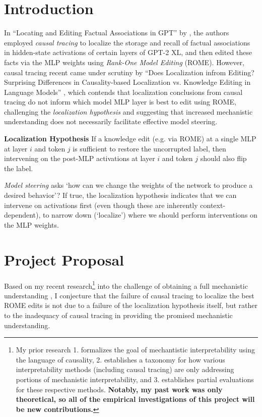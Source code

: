 \documentclass{article}
\begin{document}
\section{Introduction}

In ``Locating and Editing Factual Associations in GPT'' by \citet{meng2022locating}, the authors employed \emph{causal tracing} to localize the storage and recall of factual associations in hidden-state activations of certain layers of GPT-2 XL, and then edited these facts via the MLP weights using \emph{Rank-One Model Editing} (ROME). However, causal tracing recent came under scrutiny by ``Does Localization infrom Editing? Surprising Differences in Causality-based Localization vs. Knowledge Editing in Language Models'' \cite{hase2023does}, which contends that localization conclusions from causal tracing do not inform which model MLP layer is best to edit using ROME, challenging the \emph{localization hypothesis} and suggesting that increased mechanistic understanding does not necessarily facilitate effective model steering. 

\begin{definition} {\textbf{Localization Hypothesis}}
  If a knowledge edit (e.g. via ROME) at a single MLP at layer $i$ and token $j$ is sufficient to restore the uncorrupted label, then intervening on the post-MLP activations at layer $i$ and token $j$ should also flip the label.
\end{definition}

\emph{Model steering} asks `how can we change the weights of the network to produce a desired behavior'? If true, the localization hypothesis indicates that we can intervene on activations first (even though these are inherently context-dependent), to narrow down (`localize') where we should perform interventions on the MLP weights.

\section{Project Proposal}

Based on my recent research\footnote{My prior research 1. formalizes the goal of mechantistic interpretability using the language of causality, 2. establishes a taxonomy for how various interpretability methods (including causal tracing) are only addressing portions of mechanistic interpretability, and 3. establishes partial evaluations for these respective methods. \textbf{Notably, my past work was only theoretical, so all of the empirical investigations of this project will be new contributions.}} into the challenge of obtaining a full mechanistic understanding \cite{reber2023whatsyourusecase}, I conjecture that the failure of causal tracing to localize the best ROME edits is not due to a failure of the localization hypothesis itself, but rather to the inadequacy of causal tracing in providing the promised mechanistic understanding. 
\end{document}
